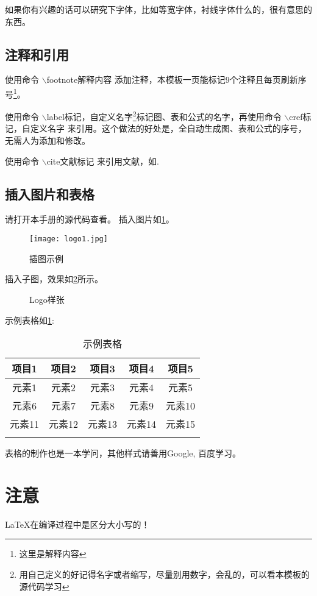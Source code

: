 如果你有兴趣的话可以研究下字体，比如等宽字体，衬线字体什么的，很有意思的东西。

\subsection{注释和引用}
使用命令 $\backslash$footnote{解释内容} 添加注释，本模板一页能标记9个注释且每页刷新序号\footnote{这里是解释内容}。

使用命令 $\backslash$label{标记，自定义名字}\footnote{用自己定义的好记得名字或者缩写，尽量别用数字，会乱的，可以看本模板的源代码学习}标记图、表和公式的名字，再使用命令 $\backslash$cref{标记，自定义名字} 来引用。这个做法的好处是，全自动生成图、表和公式的序号，无需人为添加和修改。

使用命令 $\backslash$cite{文献标记} 来引用文献，如\cite{yfbt}.

\subsection{插入图片和表格}
请打开本手册的源代码查看。
插入图片如\cref{fig.ex1}。
\begin{figure}[htbp]
	\centering\texttt{[image: logo1.jpg]}
	\caption{插图示例}\label{fig.ex1}
\end{figure}

插入子图，效果如\cref{fig.ex2}所示。
\begin{figure}[htbp]
	\centering
	\caption{Logo样张}
	\label{fig.ex2}
\end{figure}

示例表格如\cref{bg}:
\begin{longtable}{|c|c|c|c|c|}	
	\hline
	项目1 & 项目2 & 项目3 & 项目4 & 项目5 \\
	\hline
	\endhead
    元素1 & 元素2 & 元素3 & 元素4 & 元素5 \\
    \hline
    元素6 & 元素7 & 元素8 & 元素9 & 元素10 \\
    \hline
    元素11 & 元素12 & 元素13 & 元素14 & 元素15 \\
    \hline
	\caption{示例表格\label{bg}}
\end{longtable}

表格的制作也是一本学问，其他样式请善用Google, 百度学习。

\section{注意}
\LaTeX 在编译过程中是区分大小写的！



